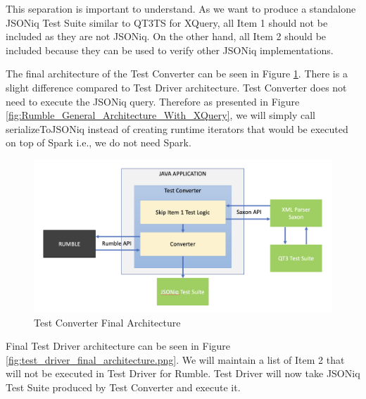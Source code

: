 This separation is important to understand. As we want to produce a standalone JSONiq Test Suite similar to QT3TS for XQuery, all Item 1 should not be included as they are not JSONiq. On the other hand, all Item 2 should be included because they can be used to verify other JSONiq implementations. 

The final architecture of the Test Converter can be seen in Figure \ref{fig:test_converter_final_architecture.png}. There is a slight difference compared to Test Driver architecture. Test Converter does not need to execute the JSONiq query. Therefore as presented in Figure \ref{fig:Rumble_General_Architecture_With_XQuery}, we will simply call serializeToJSONiq instead of creating runtime iterators that would be executed on top of Spark i.e., we do not need Spark. 

\begin{figure}[h!]
	\vspace*{-5mm}
	\includegraphics[width=\linewidth]{test_converter_final_architecture.png}
	\vspace*{-8mm}
	\caption{Test Converter Final Architecture}
	\label{fig:test_converter_final_architecture.png}
\end{figure}

\vspace*{-4mm}
Final Test Driver architecture can be seen in Figure \ref{fig:test_driver_final_architecture.png}. We will maintain a list of Item 2 that will not be executed in Test Driver for Rumble. Test Driver will now take JSONiq Test Suite produced by Test Converter and execute it. 

